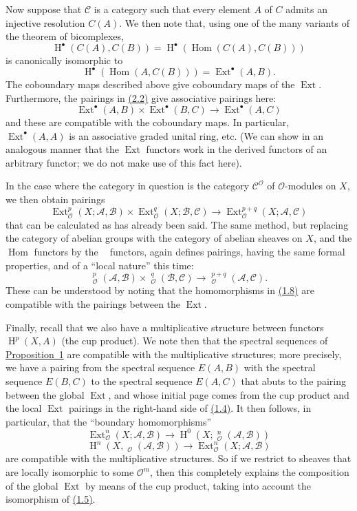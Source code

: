 \documentclass{article}
\newcommand{\scr}[1]{{\mathscr{#1}}}
\renewcommand{\cal}[1]{{\mathcal{#1}}}
\DeclareMathOperator{\Ext}{Ext}
\DeclareMathOperator{\Hom}{Hom}
\DeclareMathOperator{\shExt}{\underline{Ext}}
\DeclareMathOperator{\shHom}{\underline{Hom}}
\DeclareMathOperator{\HH}{H}
\newcommand{\oldpage}[1]{\marginpar{\footnotesize$\Big\vert$ \textit{p.~#1}}}
\begin{document}
Now suppose that $\cal{C}$ is a category such that every element $A$ of $C$ admits an injective resolution $C(A)$.
We then note that, using one of the many variants of the theorem of bicomplexes,
\[
  \HH^\bullet(C(A),C(B)) = \HH^\bullet(\Hom(C(A),C(B)))
\]
is canonically isomorphic to
\[
  \HH^\bullet(\Hom(A,C(B))) = \Ext^\bullet(A,B).
\]
The coboundary maps described above give coboundary maps of the $\Ext$.
Furthermore, the pairings in \hyperref[2.2]{(2.2)} give associative pairings here:
\[
\label{2.3}
  \Ext^\bullet(A,B)\times\Ext^\bullet(B,C) \to \Ext^\bullet(A,C)
\tag{2.3}
\]
and these are compatible with the coboundary maps.
In particular, $\Ext^\bullet(A,A)$ is an associative graded unital ring, etc.
(We can show in an analogous manner that the $\Ext$ functors work in the derived functors of an arbitrary functor;
we do not make use of this fact here).

In the case where the category in question is the category $\cal{C}^\scr{O}$ of $\scr{O}$-modules on $X$, we then obtain pairings
\[
\label{2.4}
  \Ext_\scr{O}^p(X;\scr{A},\scr{B})\times\Ext_\scr{O}^q(X;\scr{B},\scr{C}) \to \Ext_\scr{O}^{p+q}(X;\scr{A},\scr{C})
\tag{2.4}
\]
that can be calculated as has already been said.
The same method, but replacing the category of abelian groups with the category of abelian sheaves on $X$, and the $\Hom$ functors by the $\shHom$ functors, again defines pairings, having the same formal properties, and of a ``local nature'' this time:
\[
\label{2.5}
  \shExt_\scr{O}^p(\scr{A},\scr{B})\times\shExt_\scr{O}^q(\scr{B},\scr{C}) \to \shExt_\scr{O}^{p+q}(\scr{A},\scr{C}).
\tag{2.5}
\]
These can be understood by noting that the homomorphisms in \hyperref[1.8]{(1.8)} are compatible with the pairings between the $\Ext$.

\oldpage{149-05}
Finally, recall that we also have a multiplicative structure between functors $\HH^p(X,A)$ (the cup product).
We note then that the spectral sequences of \hyperref[proposition1]{Proposition~1} are compatible with the multiplicative structures;
more precisely, we have a pairing from the spectral sequence $E(A,B)$ with the spectral sequence $E(B,C)$ to the spectral sequence $E(A,C)$ that abuts to the pairing between the global $\Ext$, and whose initial page comes from the cup product and the local $\Ext$ pairings in the right-hand side of \hyperref[1.4]{(1.4)}.
It then follows, in particular, that the ``boundary homomorphisms''
\[
\label{2.6}
  \Ext_\scr{O}^n(X;\scr{A},\scr{B}) \to \HH^0(X;\shExt_\scr{O}^n(\scr{A},\scr{B}))
\tag{2.6}
\]
\[
\label{2.7}
  \HH^n(X,\shHom_\scr{O}(\scr{A},\scr{B})) \to \Ext_\scr{O}^n(X;\scr{A},\scr{B})
\tag{2.7}
\]
are compatible with the multiplicative structures.
So if we restrict to sheaves that are locally isomorphic to some $\scr{O}^m$, then this completely explains the composition of the global $\Ext$ by means of the cup product, taking into account the isomorphism of \hyperref[1.5]{(1.5)}.
\end{document}

